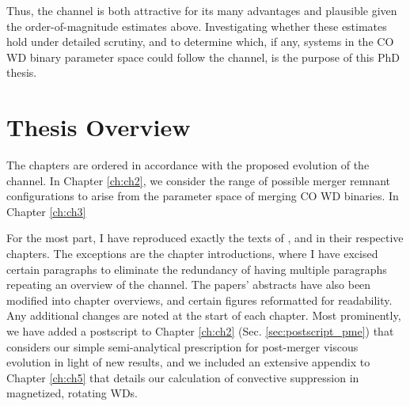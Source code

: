 Thus, the \citeal{vkercj10} channel is both attractive for its many advantages and plausible given the order-of-magnitude estimates above.  Investigating whether these estimates hold under detailed scrutiny, and to determine which, if any, systems in the CO WD binary parameter space could follow the channel, is the purpose of this PhD thesis.


\section{Thesis Overview}

The chapters are ordered in accordance with the proposed evolution of the \citeal{vkercj10} channel.  In Chapter \ref{ch:ch2}, we consider the range of possible merger remnant configurations to arise from the parameter space of merging CO WD binaries.  In Chapter \ref{ch:ch3}

For the most part, I have reproduced exactly the texts of \citeal{zhu+13}, \citeal{zhu+15} and \citeal{zhu+16} in their respective chapters.  The exceptions are the chapter introductions, where I have excised certain paragraphs to eliminate the redundancy of having multiple paragraphs repeating an overview of the \citeal{vkercj10} channel.  The papers' abstracts have also been modified into chapter overviews, and certain figures reformatted for readability.  Any additional changes are noted at the start of each chapter.  Most prominently, we have added a postscript to Chapter \ref{ch:ch2} (Sec. \ref{sec:postscript_pme}) that considers our simple semi-analytical prescription for post-merger viscous evolution in light of new results, and we included an extensive appendix to Chapter \ref{ch:ch5} that details our calculation of convective suppression in magnetized, rotating WDs.

